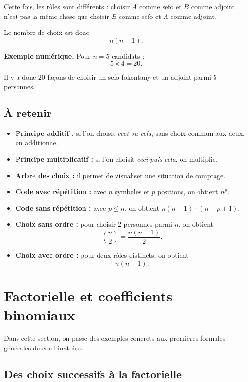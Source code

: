 Cette fois, les rôles sont différents :
choisir \(A\) comme sefo et \(B\) comme adjoint
n’est pas la même chose que choisir \(B\) comme sefo et \(A\) comme adjoint.

\medskip

Le nombre de choix est donc
\[
n(n-1).
\]

\noindent\textbf{Exemple numérique.}
Pour \(n=5\) candidats :
\[
5\times 4=20.
\]

Il y a donc \(\boxed{20}\) façons de choisir un sefo fokontany et un adjoint parmi \(5\) personnes.

\subsection{À retenir}

\begin{itemize}
    \item \textbf{Principe additif :} si l’on choisit \emph{ceci ou cela}, sans choix commun aux deux, on additionne.
    \item \textbf{Principe multiplicatif :} si l’on choisit \emph{ceci puis cela}, on multiplie.
    \item \textbf{Arbre des choix :} il permet de visualiser une situation de comptage.
    \item \textbf{Code avec répétition :} avec \(n\) symboles et \(p\) positions, on obtient \(n^p\).
    \item \textbf{Code sans répétition :} avec \(p\le n\), on obtient \(n(n-1)\cdots(n-p+1)\).
    \item \textbf{Choix sans ordre :} pour choisir \(2\) personnes parmi \(n\), on obtient
    \[
    \binom{n}{2}=\frac{n(n-1)}{2}.
    \]
    \item \textbf{Choix avec ordre :} pour deux rôles distincts, on obtient
    \[
    n(n-1).
    \]
\end{itemize}

\section{Factorielle et coefficients binomiaux}

Dans cette section, on passe des exemples concrets aux premières formules générales
de combinatoire.

\subsection{Des choix successifs à la factorielle}

